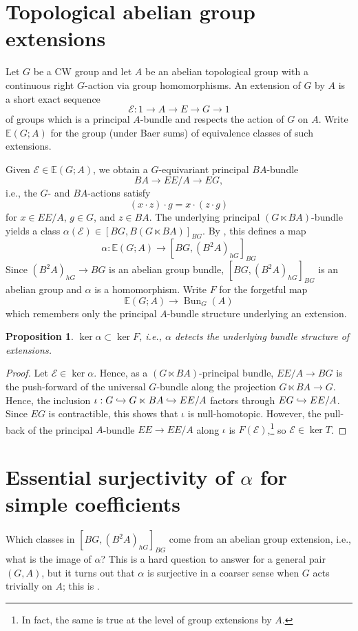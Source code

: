 \documentclass[12 pt]{article}
\newtheorem{prop}[theorem]{Proposition}
\theoremstyle{definition}
\newcommand{\E}{\mathbb{E}}
\newcommand{\calE}{\mathcal{E}}
\DeclareMathOperator{\Bun}{Bun}
\newcommand{\inc}{\xhookrightarrow{}}
\begin{document}
\section{Topological abelian group extensions}
Let $G$ be a CW group and let $A$ be an abelian topological group with a continuous right $G$-action via group homomorphisms. 
An extension of $G$ by $A$ is a short exact sequence
$$\calE: 1\to A \to E \to G \to 1$$
of groups which is a principal $A$-bundle and respects the action of $G$ on $A$.
Write $\E(G;A)$ for the group (under Baer sums) of equivalence classes of such extensions.

Given $\calE\in\E(G;A)$, we obtain a $G$-equivariant principal $BA$-bundle
$$BA\to EE/A \to EG,$$
i.e., the $G$- and $BA$-actions satisfy
$$(x\cdot z)\cdot g=x\cdot(z\cdot g)$$
for $x\in EE/A$, $g\in G$, and $z\in BA$. The underlying principal $(G\ltimes BA)$-bundle yields a class $\alpha(\calE)\in [BG, B(G\ltimes BA)]_{BG}$. By , this defines a map
$$\alpha:\E(G;A)\to [BG, (B^2A)_{hG}]_{BG}$$
Since $(B^2A)_{hG}\to BG$ is an abelian group bundle, $[BG, (B^2A)_{hG}]_{BG}$ is an abelian group and $\alpha$ is a homomorphism. Write $F$ for the forgetful map
$$\E(G;A)\to\Bun_G(A)$$
which remembers only the principal $A$-bundle structure underlying an extension.

\begin{prop}\label{bundle str}
$\ker\alpha\subset\ker F$, i.e., $\alpha$ detects the underlying bundle structure of extensions. 
\end{prop}

\begin{proof}
Let $\calE\in\ker\alpha$. Hence, as a $(G\ltimes BA)$-principal bundle, $EE/A \to BG$ is the push-forward of the universal $G$-bundle along the projection $G\ltimes BA\to G$. Hence, the inclusion $\iota:G\inc G\ltimes BA\inc EE/A$ factors through $EG\inc EE/A$. Since $EG$ is contractible, this shows that $\iota$ is null-homotopic. However, the pull-back of the principal $A$-bundle $EE\to EE/A$ along $\iota$ is $F(\calE)$,\footnote{In fact, the same is true at the level of group extensions by $A$.} so $\calE\in\ker T$.
\end{proof}

\section{Essential surjectivity of $\alpha$ for simple coefficients}

Which classes in $[BG,(B^2A)_{hG}]_{BG}$ come from an abelian group extension, i.e., what is the image of $\alpha$? This is a hard question to answer for a general pair $(G,A)$, but it turns out that $\alpha$ is surjective in a coarser sense when $G$ acts trivially on $A$; this is .
\end{document}
